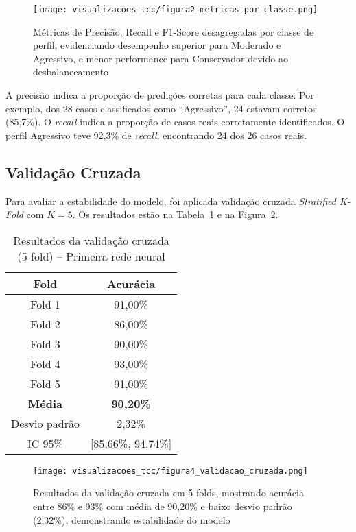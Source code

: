 \begin{figure}[htbp]
    \centering
    \texttt{[image: visualizacoes\_tcc/figura2\_metricas\_por\_classe.png]}
    \caption{Métricas de Precisão, Recall e F1-Score desagregadas por classe de perfil, evidenciando desempenho superior para Moderado e Agressivo, e menor performance para Conservador devido ao desbalanceamento}
    \label{fig:metricas_por_classe}
\end{figure}

A precisão indica a proporção de predições corretas para cada classe. Por exemplo, dos 28 casos classificados como ``Agressivo'', 24 estavam corretos (85,7\%). O \textit{recall} indica a proporção de casos reais corretamente identificados. O perfil Agressivo teve 92,3\% de \textit{recall}, encontrando 24 dos 26 casos reais.

\subsection{Validação Cruzada}

Para avaliar a estabilidade do modelo, foi aplicada validação cruzada \textit{Stratified K-Fold} com $K=5$. Os resultados estão na Tabela~\ref{tab:validacao_cruzada_primeira_rede} e na Figura~\ref{fig:validacao_cruzada}.

\begin{table}[htbp]
\centering
\caption{Resultados da validação cruzada (5-fold) -- Primeira rede neural}
\label{tab:validacao_cruzada_primeira_rede}
\begin{tabular}{@{}cc@{}}
\toprule
\textbf{Fold} & \textbf{Acurácia} \\ \midrule
Fold 1 & 91,00\% \\
Fold 2 & 86,00\% \\
Fold 3 & 90,00\% \\
Fold 4 & 93,00\% \\
Fold 5 & 91,00\% \\ \midrule
\textbf{Média} & \textbf{90,20\%} \\
Desvio padrão & 2,32\% \\
IC 95\% & [85,66\%, 94,74\%] \\ \bottomrule
\end{tabular}
\end{table}

\begin{figure}[htbp]
    \centering
    \texttt{[image: visualizacoes\_tcc/figura4\_validacao\_cruzada.png]}
    \caption{Resultados da validação cruzada em 5 folds, mostrando acurácia entre 86\% e 93\% com média de 90,20\% e baixo desvio padrão (2,32\%), demonstrando estabilidade do modelo}
    \label{fig:validacao_cruzada}
\end{figure}

